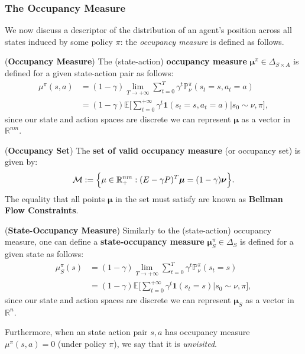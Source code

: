 \subsubsection{The Occupancy Measure}

We now discuss a descriptor of the distribution of an agent's position across all states induced by some policy $\pi$: the \textit{occupancy measure} is defined as follows.

\begin{definition}
    (\textbf{Occupancy Measure}) 
    The (state-action) \textbf{occupancy measure} $\bm{\mu}^\pi \in \Delta_{S \times A}$ is defined for a given state-action pair as follows:
    \begin{align*}
        \mu^\pi(s,a) &= (1-\gamma) \lim_{T \rightarrow + \infty} \sum_{t=0}^T \gamma^t \mathbb{P}_\nu^\pi(s_t=s,a_t=a) 
        \\
        &= (1-\gamma) \mathbb{E} \Big[ \sum_{t=0}^{+\infty} \gamma^t \mathbf{1}(s_t=s,a_t=a) \Big| s_0 \sim \nu, \pi\Big],
    \end{align*}
    since our state and action spaces are discrete we can represent $\bm{\mu}$ as a vector in $\mathbb{R}^{nm}$. 
\end{definition}

\begin{definition}
    \label{def:occupancy_set}
    (\textbf{Occupancy Set})
    The \textbf{set of valid occupancy measure} (or occupancy set) is given by:
    \begin{align*}
        \mathcal{M} := \Bigl\{ \mu \in \mathbb{R}_+^{nm} : (E-\gamma P)^T \bm{\mu} = (1-\gamma) \bm{\nu} \Bigr\}.
    \end{align*}
    The equality that all points $\bm{\mu}$ in the set must satisfy are known as \textbf{Bellman Flow Constraints}.
\end{definition}

\begin{definition}
    (\textbf{State-Occupancy Measure}) 
    Similarly to the (state-action) occupancy measure, one can define a \textbf{state-occupancy measure} $\bm{\mu}^\pi_S \in \Delta_{S}$ is defined for a given state as follows:
    \begin{align*}
        \mu^\pi_S(s) &= (1-\gamma) \lim_{T \rightarrow + \infty} \sum_{t=0}^T \gamma^t \mathbb{P}_\nu^\pi(s_t=s) \\
        &= (1-\gamma)  \mathbb{E} \Big[ \sum_{t=0}^{+\infty} \gamma^t \mathbf{1}(s_t=s) \Big| s_0 \sim \nu, \pi\Big],
    \end{align*}
    since our state and action spaces are discrete we can represent $\bm{\mu}_S$ as a vector in $\mathbb{R}^{n}$.
\end{definition}
\noindent
Furthermore, when an state action pair $s,a$ has occupancy measure $\mu^\pi(s,a)=0$ (under policy $\pi$), we say that it is \textit{unvisited}.

